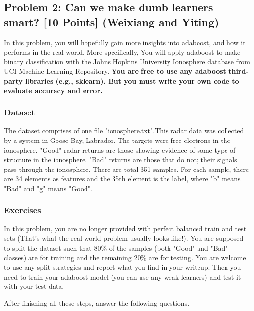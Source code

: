 \documentclass{article}
\begin{document}
\subsection*{Problem 2: Can we make dumb learners smart?
 [10 Points] (Weixiang and Yiting)}
In this problem, you will hopefully gain more insights into adaboost, and how it performs in the real world. More specifically, You will apply adaboost to make binary classification with the Johns Hopkins University Ionosphere database from UCI Machine Learning Repository. \textbf{You are free to use any adaboost third-party libraries (e.g., sklearn). But you must write your own code to evaluate accuracy and error.} 

\subsubsection*{Dataset}
The dataset comprises of one file "ionosphere.txt".This radar data was collected by a system in Goose Bay, Labrador. The targets were free electrons in the ionosphere. "Good" radar returns are those showing evidence of some type of structure in the ionosphere. "Bad" returns are those that do not; their signals pass through the ionosphere. There are total 351 samples. For each sample, there are 34 elements as features and the 35th element is the label, where "b" means "Bad" and "g" means "Good".

\subsubsection*{Exercises}
In this problem, you are no longer provided with perfect balanced train and test sets (That's what the real world problem usually looks like!). You are supposed to split the dataset such that $80\%$ of the samples (both "Good" and "Bad" classes) are for training and the remaining $20\%$ are for testing. You are welcome to use any split strategies and report what you find in your writeup. Then you need to train your adaboost model (you can use any weak learners) and test it with your test data.

After finishing all these steps, answer the following questions.
\end{document}
